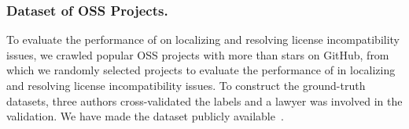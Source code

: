 \begin{table}
	\centering
	\small
	\caption{Statistics of Datasets for License Understanding }
\end{table}







\subsubsection{\textbf{Dataset of OSS Projects.}}

To evaluate the performance of \tool on localizing and resolving license incompatibility issues, we crawled  popular OSS projects with more than  stars on GitHub, from which we randomly selected  projects to evaluate the performance of \tool in localizing and resolving license incompatibility issues. To construct the ground-truth datasets, three authors cross-validated the labels and a lawyer was involved in the validation. We have made the dataset publicly available~\cite{ourwebsite}.


\fi




